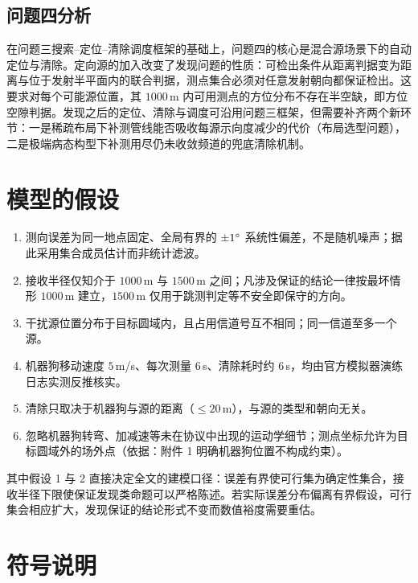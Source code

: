 \documentclass[12pt,a4paper]{ctexart}
\begin{document}
\subsection{问题四分析}

在问题三搜索--定位--清除调度框架的基础上，问题四的核心是混合源场景下的自动定位与清除。定向源的加入改变了发现问题的性质：可检出条件从距离判据变为距离与位于发射半平面内的联合判据，测点集合必须对任意发射朝向都保证检出。这要求对每个可能源位置，其 $1000\,$m 内可用测点的方位分布不存在半空缺，即方位空隙判据。发现之后的定位、清除与调度可沿用问题三框架，但需要补齐两个新环节：一是稀疏布局下补测管线能否吸收每源示向度减少的代价（布局选型问题），二是极端病态构型下补测用尽仍未收敛频道的兜底清除机制。

\section{模型的假设}

\begin{enumerate}[leftmargin=2em,itemsep=2pt]
  \item 测向误差为同一地点固定、全局有界的 $\pm 1^{\circ}$ 系统性偏差，不是随机噪声；据此采用集合成员估计而非统计滤波。
  \item 接收半径仅知介于 $1000\,$m 与 $1500\,$m 之间；凡涉及保证的结论一律按最坏情形 $1000\,$m 建立，$1500\,$m 仅用于跳测判定等不安全即保守的方向。
  \item 干扰源位置分布于目标圆域内，且占用信道号互不相同；同一信道至多一个源。
  \item 机器狗移动速度 $5\,$m/s、每次测量 $6\,$s、清除耗时约 $6\,$s，均由官方模拟器演练日志实测反推核实。
  \item 清除只取决于机器狗与源的距离（$\le 20\,$m），与源的类型和朝向无关。
  \item 忽略机器狗转弯、加减速等未在协议中出现的运动学细节；测点坐标允许为目标圆域外的场外点（依据：附件 1 明确机器狗位置不构成约束）。
\end{enumerate}

其中假设 1 与 2 直接决定全文的建模口径：误差有界使可行集为确定性集合，接收半径下限使保证发现类命题可以严格陈述。若实际误差分布偏离有界假设，可行集会相应扩大，发现保证的结论形式不变而数值裕度需要重估。

\section{符号说明}
\end{document}
